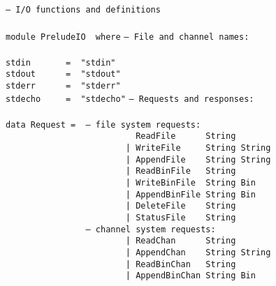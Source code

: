 \noindent\bprogB
\mbox{\tt --\ I/O\ functions\ and\ definitions}\\
\mbox{\tt }\\[-8pt]
\mbox{\tt module\ PreludeIO\ \ where}
%
\eprogB\noindent\bprogB
\mbox{\tt --\ File\ and\ channel\ names:}\\
\mbox{\tt }\\[-8pt]
\mbox{\tt stdin\ \ \ \ \ \ \ =\ \ "stdin"}\\
\mbox{\tt stdout\ \ \ \ \ \ =\ \ "stdout"}\\
\mbox{\tt stderr\ \ \ \ \ \ =\ \ "stderr"}\\
\mbox{\tt stdecho\ \ \ \ \ =\ \ "stdecho"}
\eprogB\noindent\bprogB
\mbox{\tt --\ Requests\ and\ responses:}\\
\mbox{\tt }\\[-8pt]
\mbox{\tt data\ Request\ =\ \ --\ file\ system\ requests:}\\
\mbox{\tt \ \ \ \ \ \ \ \ \ \ \ \ \ \ \ \ \ \ \ \ \ \ \ \ \ \ ReadFile\ \ \ \ \ \ String\ \ \ \ \ \ \ \ \ }\\
\mbox{\tt \ \ \ \ \ \ \ \ \ \ \ \ \ \ \ \ \ \ \ \ \ \ \ \ |\ WriteFile\ \ \ \ \ String\ String}\\
\mbox{\tt \ \ \ \ \ \ \ \ \ \ \ \ \ \ \ \ \ \ \ \ \ \ \ \ |\ AppendFile\ \ \ \ String\ String}\\
\mbox{\tt \ \ \ \ \ \ \ \ \ \ \ \ \ \ \ \ \ \ \ \ \ \ \ \ |\ ReadBinFile\ \ \ String\ }\\
\mbox{\tt \ \ \ \ \ \ \ \ \ \ \ \ \ \ \ \ \ \ \ \ \ \ \ \ |\ WriteBinFile\ \ String\ Bin}\\
\mbox{\tt \ \ \ \ \ \ \ \ \ \ \ \ \ \ \ \ \ \ \ \ \ \ \ \ |\ AppendBinFile\ String\ Bin}\\
\mbox{\tt \ \ \ \ \ \ \ \ \ \ \ \ \ \ \ \ \ \ \ \ \ \ \ \ |\ DeleteFile\ \ \ \ String}\\
\mbox{\tt \ \ \ \ \ \ \ \ \ \ \ \ \ \ \ \ \ \ \ \ \ \ \ \ |\ StatusFile\ \ \ \ String}\\
\mbox{\tt \ \ \ \ \ \ \ \ \ \ \ \ \ \ \ \ --\ channel\ system\ requests:}\\
\mbox{\tt \ \ \ \ \ \ \ \ \ \ \ \ \ \ \ \ \ \ \ \ \ \ \ \ |\ ReadChan\ \ \ \ \ \ String\ }\\
\mbox{\tt \ \ \ \ \ \ \ \ \ \ \ \ \ \ \ \ \ \ \ \ \ \ \ \ |\ AppendChan\ \ \ \ String\ String}\\
\mbox{\tt \ \ \ \ \ \ \ \ \ \ \ \ \ \ \ \ \ \ \ \ \ \ \ \ |\ ReadBinChan\ \ \ String\ }\\
\mbox{\tt \ \ \ \ \ \ \ \ \ \ \ \ \ \ \ \ \ \ \ \ \ \ \ \ |\ AppendBinChan\ String\ Bin}\\
